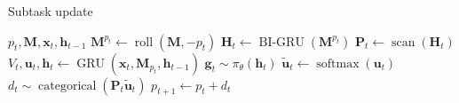 \documentclass{article}
\DeclareMathOperator{\GRU}{GRU}
\DeclareMathOperator{\BIGRU}{BI-GRU}
\DeclareMathOperator{\Cat}{categorical}
\DeclareMathOperator{\roll}{roll}
\DeclareMathOperator{\scan}{scan}
\DeclareMathOperator{\softmax}{softmax}
\begin{document}
\begin{algorithm}[b]
  \caption{Subtask update}
  \label{algo}
  \begin{algorithmic}[1]
     $p_t, \mathbf{M} , \mathbf{x}_t, \mathbf{h}_{t-1}$
    \STATE $\mathbf{M}^{p_t} \gets \roll\left(\mathbf{M}, -p_t\right)$
    \STATE ${\mathbf{H}_t} \gets \BIGRU\left(\mathbf{M}^{p_t}\right)$
    \STATE ${\mathbf{P}_t \gets \scan\left(\mathbf{H}_t\right)}$
    \STATE $V_t, \mathbf{u}_t, \mathbf{h}_t  \gets \GRU\left(\mathbf{x}_t, \mathbf{M}_{p_t}, \mathbf{h}_{t-1}\right)$
    \STATE $\mathbf{g}_{t} \sim \pi_\theta\left(\mathbf{h}_t\right)$
    \STATE $\tilde{\mathbf{u}}_{t} \gets \softmax\left(\mathbf{u}_t\right)$
    \STATE $d_{t} \sim \Cat\left(\mathbf{P}_t\tilde{\mathbf{u}}_t\right)$ 
    \STATE $p_{t + 1} \gets p_t + d_t$
  \end{algorithmic}
\end{algorithm}
\end{document}
